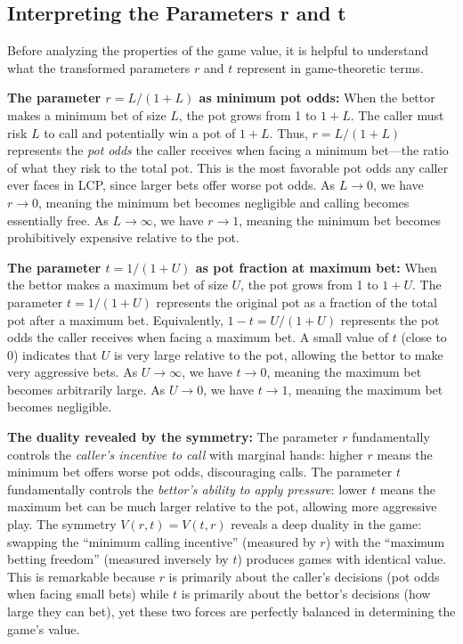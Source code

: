 \documentclass[../../main/main.tex]{subfiles}
\begin{document}
\subsection{Interpreting the Parameters r and t}

Before analyzing the properties of the game value, it is helpful to understand what the transformed parameters $r$ and $t$ represent in game-theoretic terms.

\textbf{The parameter $r = L/(1+L)$ as minimum pot odds:}
When the bettor makes a minimum bet of size $L$, the pot grows from 1 to $1+L$. The caller must risk $L$ to call and potentially win a pot of $1+L$. Thus, $r = L/(1+L)$ represents the \emph{pot odds} the caller receives when facing a minimum bet---the ratio of what they risk to the total pot. This is the most favorable pot odds any caller ever faces in LCP, since larger bets offer worse pot odds. As $L \to 0$, we have $r \to 0$, meaning the minimum bet becomes negligible and calling becomes essentially free. As $L \to \infty$, we have $r \to 1$, meaning the minimum bet becomes prohibitively expensive relative to the pot.

\textbf{The parameter $t = 1/(1+U)$ as pot fraction at maximum bet:}
When the bettor makes a maximum bet of size $U$, the pot grows from 1 to $1+U$. The parameter $t = 1/(1+U)$ represents the original pot as a fraction of the total pot after a maximum bet. Equivalently, $1-t = U/(1+U)$ represents the pot odds the caller receives when facing a maximum bet. A small value of $t$ (close to 0) indicates that $U$ is very large relative to the pot, allowing the bettor to make very aggressive bets. As $U \to \infty$, we have $t \to 0$, meaning the maximum bet becomes arbitrarily large. As $U \to 0$, we have $t \to 1$, meaning the maximum bet becomes negligible.

\textbf{The duality revealed by the symmetry:}
The parameter $r$ fundamentally controls the \emph{caller's incentive to call} with marginal hands: higher $r$ means the minimum bet offers worse pot odds, discouraging calls. The parameter $t$ fundamentally controls the \emph{bettor's ability to apply pressure}: lower $t$ means the maximum bet can be much larger relative to the pot, allowing more aggressive play. The symmetry $V(r,t) = V(t,r)$ reveals a deep duality in the game: swapping the ``minimum calling incentive'' (measured by $r$) with the ``maximum betting freedom'' (measured inversely by $t$) produces games with identical value. This is remarkable because $r$ is primarily about the caller's decisions (pot odds when facing small bets) while $t$ is primarily about the bettor's decisions (how large they can bet), yet these two forces are perfectly balanced in determining the game's value.
\end{document}
